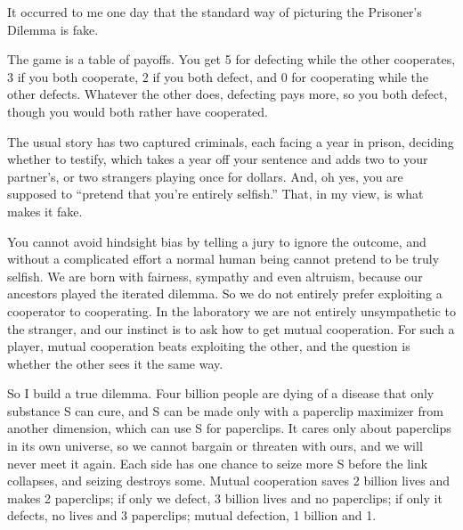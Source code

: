 
It occurred to me one day that the standard way of picturing the Prisoner's Dilemma is fake.

The game is a table of payoffs. You get 5 for defecting while the other cooperates, 3 if you both cooperate, 2 if you both defect, and 0 for cooperating while the other defects. Whatever the other does, defecting pays more, so you both defect, though you would both rather have cooperated.

The usual story has two captured criminals, each facing a year in prison, deciding whether to testify, which takes a year off your sentence and adds two to your partner's, or two strangers playing once for dollars. And, oh yes, you are supposed to ``pretend that you're entirely selfish.'' That, in my view, is what makes it fake. 

You cannot avoid hindsight bias by telling a jury to ignore the outcome, and without a complicated effort a normal human being cannot pretend to be truly selfish.  We are born with fairness, sympathy and even altruism, because our ancestors played the iterated dilemma.  So we do not entirely prefer exploiting a cooperator to cooperating. In the laboratory we are not entirely unsympathetic to the stranger, and our instinct is to ask how to get mutual cooperation.  For such a player, mutual cooperation beats exploiting the other, and the question is whether the other sees it the same way. 

So I build a true dilemma. Four billion people are dying of a disease that only substance S can cure, and S can be made only with a paperclip maximizer from another dimension, which can use S for paperclips. It cares only about paperclips in its own universe, so we cannot bargain or threaten with ours, and we will never meet it again. Each side has one chance to seize more S before the link collapses, and seizing destroys some. Mutual cooperation saves 2 billion lives and makes 2 paperclips; if only we defect, 3 billion lives and no paperclips; if only it defects, no lives and 3 paperclips; mutual defection, 1 billion and 1.

